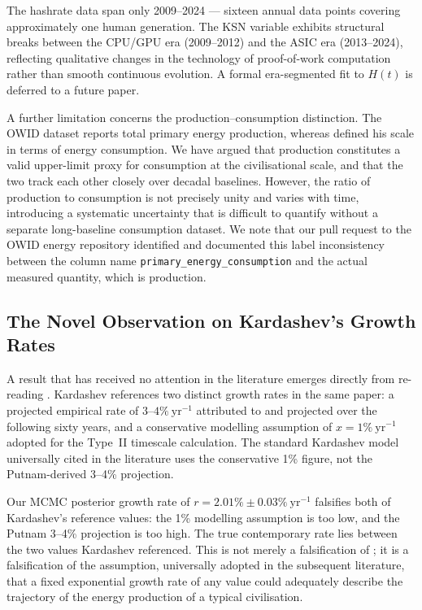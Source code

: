 The hashrate data span only 2009--2024 --- sixteen annual data points covering
approximately one human generation. The KSN variable exhibits structural breaks between
the CPU/GPU era (2009--2012) and the ASIC era (2013--2024), reflecting qualitative changes
in the technology of proof-of-work computation rather than smooth continuous evolution. A
formal era-segmented fit to $H(t)$ is deferred to a future paper.

A further limitation concerns the production--consumption distinction. The OWID dataset
reports total primary energy production, whereas \citet{Kardashev1964} defined his scale
in terms of energy consumption. We have argued that production constitutes a valid
upper-limit proxy for consumption at the civilisational scale, and that the two track each
other closely over decadal baselines. However, the ratio of production to consumption is
not precisely unity and varies with time, introducing a systematic uncertainty that is
difficult to quantify without a separate long-baseline consumption dataset. We note that
our pull request to the OWID energy repository \citep{Ritchie2022} identified and
documented this label inconsistency between the column name
\texttt{primary\_energy\_consumption} and the actual measured quantity, which is
production.

\subsection{The Novel Observation on Kardashev's Growth Rates}
\label{sec:growthrates}

A result that has received no attention in the literature emerges directly from re-reading
\citet{Kardashev1964}. Kardashev references two distinct growth rates in the same paper: a
projected empirical rate of $3$--$4\%~\mathrm{yr^{-1}}$ attributed to \citet{Putnam1948}
and projected over the following sixty years, and a conservative modelling assumption of
$x=1\%~\mathrm{yr^{-1}}$ adopted for the Type~II timescale calculation. The standard
Kardashev model universally cited in the literature \citep{Gray2020} uses the conservative
1\% figure, not the Putnam-derived 3--4\% projection.

Our MCMC posterior growth rate of $r=2.01\%\pm0.03\%~\mathrm{yr^{-1}}$ falsifies both of
Kardashev's reference values: the 1\% modelling assumption is too low, and the Putnam
3--4\% projection is too high. The true contemporary rate lies between the two values
Kardashev referenced. This is not merely a falsification of \citet{Kardashev1964}; it is a
falsification of the assumption, universally adopted in the subsequent literature, that a
fixed exponential growth rate of any value could adequately describe the trajectory of the
energy production of a typical civilisation.


